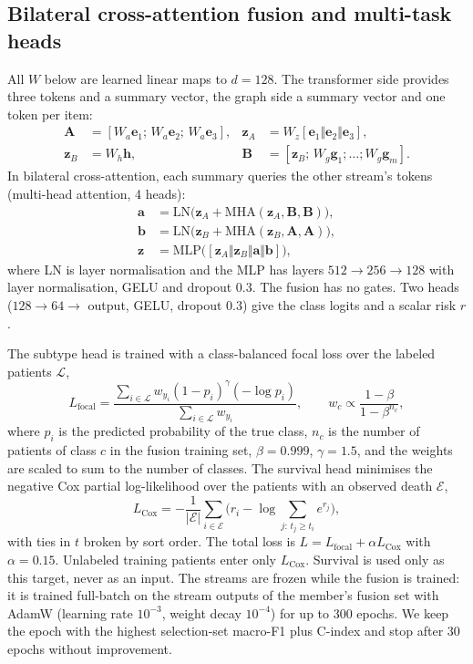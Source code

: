 \documentclass[conference]{IEEEtran}
\begin{document}
\subsection{Bilateral cross-attention fusion and multi-task heads}
\label{sec:fusion}
All $W$ below are learned linear maps to $d=128$. The transformer side provides three tokens and a summary vector, the
graph side a summary vector and one token per item:
\begin{align}
\mathbf{A}&=[W_a\mathbf{e}_1;\,W_a\mathbf{e}_2;\,W_a\mathbf{e}_3], &
\mathbf{z}_A&=W_z[\mathbf{e}_1\Vert\mathbf{e}_2\Vert\mathbf{e}_3],\\
\mathbf{z}_B&=W_h\mathbf{h}, &
\mathbf{B}&=[\mathbf{z}_B;\,W_g\mathbf{g}_1;\dots;W_g\mathbf{g}_m].
\end{align}
In bilateral cross-attention, each summary queries the other stream's tokens (multi-head attention, 4 heads):
\begin{align}
\mathbf{a}&=\mathrm{LN}\big(\mathbf{z}_A+\mathrm{MHA}(\mathbf{z}_A,\mathbf{B},\mathbf{B})\big),\\
\mathbf{b}&=\mathrm{LN}\big(\mathbf{z}_B+\mathrm{MHA}(\mathbf{z}_B,\mathbf{A},\mathbf{A})\big),\\
\mathbf{z}&=\mathrm{MLP}\big([\mathbf{z}_A\Vert\mathbf{z}_B\Vert\mathbf{a}\Vert\mathbf{b}]\big),
\end{align}
where LN is layer normalisation and the MLP has layers $512\rightarrow256\rightarrow128$ with layer normalisation, GELU
and dropout 0.3. The fusion has no gates. Two heads ($128\rightarrow64\rightarrow$ output, GELU, dropout 0.3) give the
class logits and a scalar risk $r$.

The subtype head is trained with a class-balanced focal loss \cite{lin2017focal,cui2019classbalanced} over the labeled
patients $\mathcal{L}$,
\begin{equation}
L_{\mathrm{focal}}=\frac{\sum_{i\in\mathcal{L}} w_{y_i}(1-p_i)^{\gamma}(-\log p_i)}{\sum_{i\in\mathcal{L}} w_{y_i}},
\qquad w_c\propto\frac{1-\beta}{1-\beta^{n_c}},
\end{equation}
where $p_i$ is the predicted probability of the true class, $n_c$ is the number of patients of class $c$ in the fusion
training set, $\beta=0.999$, $\gamma=1.5$, and the weights are scaled to sum to the number of classes. The survival head
minimises the negative Cox partial log-likelihood \cite{cox1972} over the patients with an observed death $\mathcal{E}$,
\begin{equation}
L_{\mathrm{Cox}}=-\frac{1}{|\mathcal{E}|}\sum_{i\in\mathcal{E}}\Big(r_i-\log\!\!\sum_{j:\,t_j\ge t_i}\!\!e^{r_j}\Big),
\end{equation}
with ties in $t$ broken by sort order. The total loss is $L=L_{\mathrm{focal}}+\alpha L_{\mathrm{Cox}}$ with
$\alpha=0.15$. Unlabeled training patients enter only $L_{\mathrm{Cox}}$. Survival is used only as this target, never as
an input. The streams are frozen while the fusion is trained: it is trained full-batch on the stream outputs of the
member's fusion set with AdamW (learning rate $10^{-3}$, weight decay $10^{-4}$) for up to 300 epochs. We keep the epoch
with the highest selection-set macro-F1 plus C-index and stop after 30 epochs without improvement.
\end{document}
